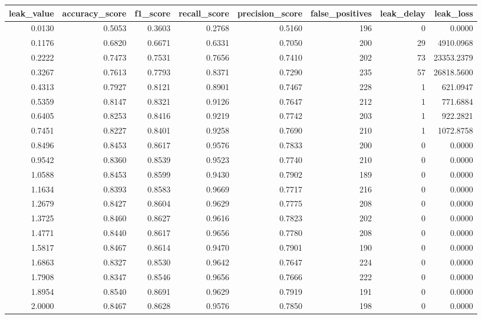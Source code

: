 \begin{tabular}{rrrrrrrr}
\toprule
leak\_value & accuracy\_score & f1\_score & recall\_score & precision\_score & false\_positives & leak\_delay & leak\_loss \\
\midrule
0.0130 & 0.5053 & 0.3603 & 0.2768 & 0.5160 & 196 & 0 & 0.0000 \\
0.1176 & 0.6820 & 0.6671 & 0.6331 & 0.7050 & 200 & 29 & 4910.0968 \\
0.2222 & 0.7473 & 0.7531 & 0.7656 & 0.7410 & 202 & 73 & 23353.2379 \\
0.3267 & 0.7613 & 0.7793 & 0.8371 & 0.7290 & 235 & 57 & 26818.5600 \\
0.4313 & 0.7927 & 0.8121 & 0.8901 & 0.7467 & 228 & 1 & 621.0947 \\
0.5359 & 0.8147 & 0.8321 & 0.9126 & 0.7647 & 212 & 1 & 771.6884 \\
0.6405 & 0.8253 & 0.8416 & 0.9219 & 0.7742 & 203 & 1 & 922.2821 \\
0.7451 & 0.8227 & 0.8401 & 0.9258 & 0.7690 & 210 & 1 & 1072.8758 \\
0.8496 & 0.8453 & 0.8617 & 0.9576 & 0.7833 & 200 & 0 & 0.0000 \\
0.9542 & 0.8360 & 0.8539 & 0.9523 & 0.7740 & 210 & 0 & 0.0000 \\
1.0588 & 0.8453 & 0.8599 & 0.9430 & 0.7902 & 189 & 0 & 0.0000 \\
1.1634 & 0.8393 & 0.8583 & 0.9669 & 0.7717 & 216 & 0 & 0.0000 \\
1.2679 & 0.8427 & 0.8604 & 0.9629 & 0.7775 & 208 & 0 & 0.0000 \\
1.3725 & 0.8460 & 0.8627 & 0.9616 & 0.7823 & 202 & 0 & 0.0000 \\
1.4771 & 0.8440 & 0.8617 & 0.9656 & 0.7780 & 208 & 0 & 0.0000 \\
1.5817 & 0.8467 & 0.8614 & 0.9470 & 0.7901 & 190 & 0 & 0.0000 \\
1.6863 & 0.8327 & 0.8530 & 0.9642 & 0.7647 & 224 & 0 & 0.0000 \\
1.7908 & 0.8347 & 0.8546 & 0.9656 & 0.7666 & 222 & 0 & 0.0000 \\
1.8954 & 0.8540 & 0.8691 & 0.9629 & 0.7919 & 191 & 0 & 0.0000 \\
2.0000 & 0.8467 & 0.8628 & 0.9576 & 0.7850 & 198 & 0 & 0.0000 \\
\bottomrule
\end{tabular}
